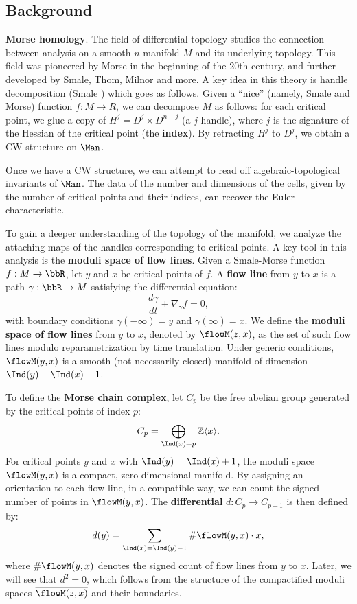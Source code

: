 \subsection*{Background}
\textbf{Morse homology}. The field of differential topology studies the connection between analysis on a smooth $n$-manifold $M$ and its underlying topology. This field was pioneered by Morse in the beginning of the 20th century, and further developed by Smale, Thom, Milnor and more. A key idea in this theory is handle decomposition (Smale \cite{smale1962structure}) which goes as follows. Given a ``nice'' (namely, Smale and Morse) function $f \colon M\to R$, we can decompose $M$ as follows: for each critical point, we glue a copy of $H^j = D^j \times D^{n-j}$ (a $j$-handle), where $j$ is the signature of the Hessian of the critical point (the \textbf{index}). By retracting $H^j$ to $D^j$, we obtain a CW structure on $\Man$.

Once we have a CW structure, we can attempt to read off algebraic-topological invariants of $\Man$. The data of the number and dimensions of the cells, given by the number of critical points and their indices, can recover the Euler characteristic.

To gain a deeper understanding of the topology of the manifold, we analyze the attaching maps of the handles corresponding to critical points. A key tool in this analysis is the \textbf{moduli space of flow lines}. Given a Smale-Morse function $ f: M \to \bbR $, let $ y $ and $ x $ be critical points of $ f $. A \textbf{flow line} from $ y $ to $ x $ is a path $ \gamma: \bbR \to M $ satisfying the differential equation:
\begin{equation*}
\frac{d\gamma}{dt} + \nabla_\gamma f = 0,
\end{equation*}
with boundary conditions $ \gamma(-\infty) = y $ and $ \gamma(\infty) = x $. We define the \textbf{moduli space of flow lines} from $ y $ to $ x $, denoted by $ \flowM(z,x) $, as the set of such flow lines modulo reparametrization by time translation. Under generic conditions, $ \flowM(y, x) $ is a smooth (not necessarily closed) manifold of dimension $ \Ind(y) - \Ind(x) - 1 $.

To define the \textbf{Morse chain complex}, let $ C_p $ be the free abelian group generated by the critical points of index $ p $:
\begin{equation*}
C_p = \bigoplus_{\Ind(x) = p} \mathbb{Z} \langle x \rangle.
\end{equation*}
For critical points $ y $ and $ x $ with $ \Ind(y) = \Ind(x) + 1 $, the moduli space $ \flowM(y, x) $ is a compact, zero-dimensional manifold. By assigning an orientation to each flow line, in a compatible way, we can count the signed number of points in $ \flowM(y, x) $. The \textbf{differential} $ d: C_p \to C_{p-1} $ is then defined by:
\begin{equation*}
d(y) = \sum_{\Ind(x) = \Ind(y) - 1} \# \flowM(y, x) \cdot x,
\end{equation*}
where $ \# \flowM(y, x) $ denotes the signed count of flow lines from $ y $ to $ x $. Later, we will see that $ d^2 = 0 $, which follows from the structure of the compactified moduli spaces $ \overline{\flowM(z, x)} $ and their boundaries.

